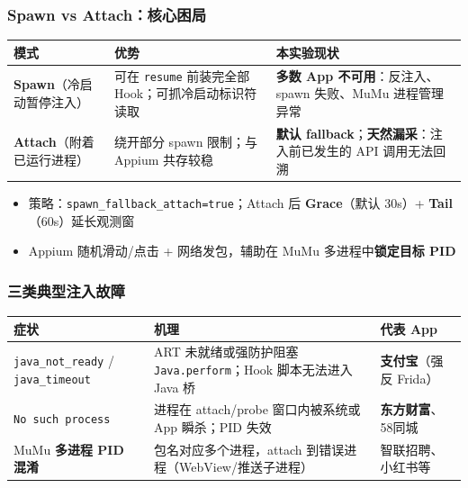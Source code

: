 \documentclass[AutoFakeBold,AutoFakeSlant]{beamer}
\begin{document}
\begin{frame}
    \frametitle{Spawn vs Attach：核心困局}
    \small
    \begin{tabularx}{\textwidth}{|l|X|X|}
        \hline
        \textbf{模式} & \textbf{优势} & \textbf{本实验现状} \\
        \hline
        \textbf{Spawn}（冷启动暂停注入） & 可在 \texttt{resume} 前装完全部 Hook；可抓冷启动标识符读取 & \textbf{多数 App 不可用}：反注入、spawn 失败、MuMu 进程管理异常 \\
        \hline
        \textbf{Attach}（附着已运行进程） & 绕开部分 spawn 限制；与 Appium 共存较稳 & \textbf{默认 fallback}；\textbf{天然漏采}：注入前已发生的 API 调用无法回溯 \\
        \hline
    \end{tabularx}
    \vspace{0.4em}
    \begin{itemize}
        \item 策略：\texttt{spawn\_fallback\_attach=true}；Attach 后 \textbf{Grace}（默认 30s）+ \textbf{Tail}（60s）延长观测窗
        \item Appium 随机滑动/点击 + 网络发包，辅助在 MuMu 多进程中\textbf{锁定目标 PID}
    \end{itemize}
\end{frame}

\begin{frame}
    \frametitle{三类典型注入故障}
    \small
    \begin{tabularx}{\textwidth}{|l|X|l|}
        \hline
        \textbf{症状} & \textbf{机理} & \textbf{代表 App} \\
        \hline
        \texttt{java\_not\_ready} / \texttt{java\_timeout} & ART 未就绪或强防护阻塞 \texttt{Java.perform}；Hook 脚本无法进入 Java 桥 & \textbf{支付宝}（强反 Frida） \\
        \hline
        \texttt{No such process} & 进程在 attach/probe 窗口内被系统或 App 瞬杀；PID 失效 & \textbf{东方财富}、58同城 \\
        \hline
        MuMu \textbf{多进程 PID 混淆} & 包名对应多个进程，attach 到错误进程（WebView/推送子进程） & 智联招聘、小红书等 \\
        \hline
    \end{tabularx}
\end{frame}
\end{document}
